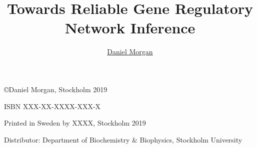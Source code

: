\documentclass[twoside,11pt]{Latex/Classes/PhDthesisSU} %
\title{Towards Reliable Gene Regulatory Network Inference}%
\subtitle{}%
\author{\href{mailto:daniel.morgan@dbb.su.se}{Daniel Morgan}}
\begin{document}

\frontmatterSU

\halftitlepage


\maketitle  %



\newpage
\thispagestyle{empty}


\phantom{.}


{\selectfont
{\scriptsize
\noindent
\copyright Daniel Morgan, Stockholm 2019 %
 
\vspace{5mm}
\noindent
ISBN XXX-XX-XXXX-XXX-X %

\vspace{5mm}
\noindent
Printed in Sweden by XXXX, Stockholm 2019 %

\noindent
Distributor: Department of Biochemistry \& Biophysics, Stockholm University %
}
}
\cleardoublepage








\setcounter{secnumdepth}{2} %
\setcounter{tocdepth}{2}    %
\tableofcontents            %
\end{document}
